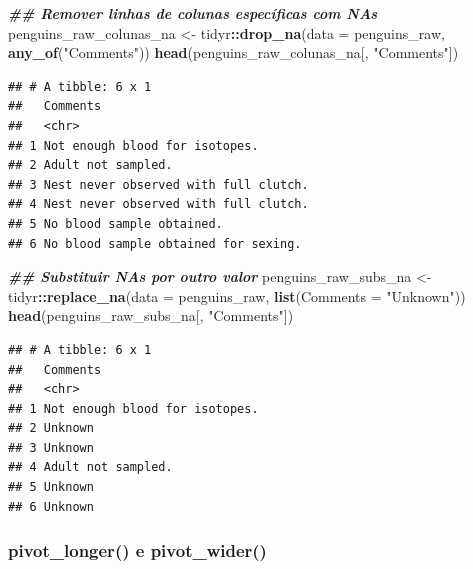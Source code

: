 \documentclass[
]{article}
\newenvironment{Shaded}{\begin{snugshade}}{\end{snugshade}}
\newcommand{\AttributeTok}[1]{\textcolor[rgb]{0.13,0.29,0.53}{#1}}
\newcommand{\DocumentationTok}[1]{\textcolor[rgb]{0.56,0.35,0.01}{\textbf{\textit{#1}}}}
\newcommand{\FunctionTok}[1]{\textcolor[rgb]{0.13,0.29,0.53}{\textbf{#1}}}
\newcommand{\NormalTok}[1]{#1}
\newcommand{\OtherTok}[1]{\textcolor[rgb]{0.56,0.35,0.01}{#1}}
\newcommand{\SpecialCharTok}[1]{\textcolor[rgb]{0.81,0.36,0.00}{\textbf{#1}}}
\newcommand{\StringTok}[1]{\textcolor[rgb]{0.31,0.60,0.02}{#1}}
\begin{document}
\begin{Shaded}
\begin{Highlighting}[]
\DocumentationTok{\#\# Remover linhas de colunas específicas com NAs}
\NormalTok{penguins\_raw\_colunas\_na }\OtherTok{\textless{}{-}}\NormalTok{ tidyr}\SpecialCharTok{::}\FunctionTok{drop\_na}\NormalTok{(}\AttributeTok{data =}\NormalTok{ penguins\_raw,}
                                          \FunctionTok{any\_of}\NormalTok{(}\StringTok{"Comments"}\NormalTok{))}
\FunctionTok{head}\NormalTok{(penguins\_raw\_colunas\_na[, }\StringTok{"Comments"}\NormalTok{])}
\end{Highlighting}
\end{Shaded}

\begin{verbatim}
## # A tibble: 6 x 1
##   Comments                             
##   <chr>                                
## 1 Not enough blood for isotopes.       
## 2 Adult not sampled.                   
## 3 Nest never observed with full clutch.
## 4 Nest never observed with full clutch.
## 5 No blood sample obtained.            
## 6 No blood sample obtained for sexing.
\end{verbatim}

\begin{Shaded}
\begin{Highlighting}[]
\DocumentationTok{\#\# Substituir NAs por outro valor}
\NormalTok{penguins\_raw\_subs\_na }\OtherTok{\textless{}{-}}\NormalTok{ tidyr}\SpecialCharTok{::}\FunctionTok{replace\_na}\NormalTok{(}\AttributeTok{data =}\NormalTok{ penguins\_raw,}
                                          \FunctionTok{list}\NormalTok{(}\AttributeTok{Comments =} \StringTok{"Unknown"}\NormalTok{))}
\FunctionTok{head}\NormalTok{(penguins\_raw\_subs\_na[, }\StringTok{"Comments"}\NormalTok{])}
\end{Highlighting}
\end{Shaded}

\begin{verbatim}
## # A tibble: 6 x 1
##   Comments                      
##   <chr>                         
## 1 Not enough blood for isotopes.
## 2 Unknown                       
## 3 Unknown                       
## 4 Adult not sampled.            
## 5 Unknown                       
## 6 Unknown
\end{verbatim}

\hypertarget{pivot_longer-e-pivot_wider}{%
\subsubsection{pivot\_longer() e pivot\_wider()}\label{pivot_longer-e-pivot_wider}}
\end{document}
